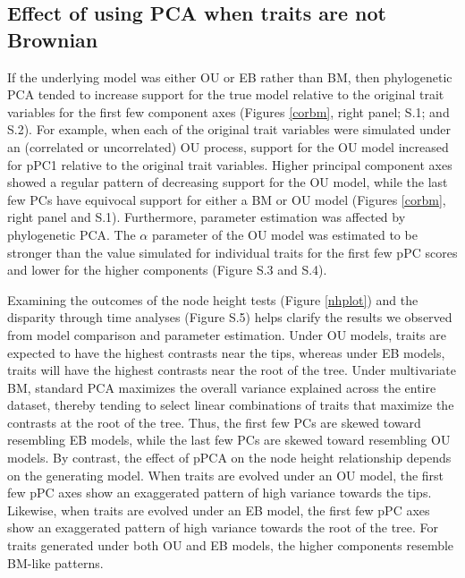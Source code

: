 \documentclass[a4paper,11pt]{article}
\begin{document}
\subsection{Effect of using PCA when traits are not Brownian}
If the underlying model was either OU or EB rather than BM, then phylogenetic PCA tended to increase support for the true model relative to the original trait variables for the first few component axes (Figures \ref{corbm}, right panel; S.1; and S.2). For example, when each of the original trait variables were simulated under an (correlated or uncorrelated) OU process, support for the OU model increased for pPC1 relative to the original trait variables. Higher principal component axes showed a regular pattern of decreasing support for the OU model, while the last few PCs have equivocal support for either a BM or OU model (Figures \ref{corbm}, right panel and S.1). Furthermore, parameter estimation was affected by phylogenetic PCA. The $\alpha$ parameter of the OU model was estimated to be stronger than the value simulated for individual traits for the first few pPC scores and lower for the higher components (Figure S.3 and S.4). 

Examining the outcomes of the node height tests (Figure \ref{nhplot}) and the disparity through time analyses (Figure S.5) helps clarify the results we observed from model comparison and parameter estimation. Under OU models, traits are expected to have the highest contrasts near the tips, whereas under EB models, traits will have the highest contrasts near the root of the tree. Under multivariate BM, standard PCA maximizes the overall variance explained across the entire dataset, thereby tending to select linear combinations of traits that maximize the contrasts at the root of the tree. Thus, the first few PCs are skewed toward resembling EB models, while the last few PCs are skewed toward resembling OU models. By contrast, the effect of pPCA on the node height relationship depends on the generating model. When traits are evolved under an OU model, the first few pPC axes show an exaggerated pattern of high variance towards the tips. Likewise, when traits are evolved under an EB model, the first few pPC axes show an exaggerated pattern of high variance towards the root of the tree. For traits generated under both OU and EB models, the higher components resemble BM-like patterns. 
\end{document}

